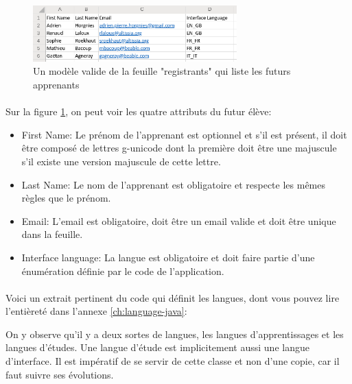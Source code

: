 \begin{figure}[ht]
    \centering
    \includegraphics[width=0.7\textwidth]{images/screenshot/sheet-users.png}
    \caption{Un modèle valide de la feuille "registrants" qui liste les futurs apprenants}
    \label{fig:sheet-learners}
\end{figure}

\paragraph{}
Sur la figure \ref{fig:sheet-learners}, on peut voir les quatre attributs du futur élève:
\begin{itemize}
    \item First Name: Le prénom de l'apprenant est optionnel et s'il est présent, il doit être composé de lettres \gls{g-unicode} dont la première doit être une majuscule s'il existe une version majuscule de cette lettre\fnmark{}.
    \item Last Name: Le nom de l'apprenant est obligatoire et respecte les mêmes règles que le prénom.
    \item Email: L'email est obligatoire, doit être un email valide et doit être unique dans la feuille.
    \item Interface language: La langue est obligatoire et doit faire partie d'une énumération définie par le code de l'application.
\end{itemize}

\paragraph{}
Voici un extrait pertinent du code qui définit les langues, dont vous pouvez lire l'entièreté dans l'annexe \ref{ch:language-java}:



On y observe qu'il y a deux sortes de langues, les langues d'apprentissages et les langues d'études.
Une langue d'étude est implicitement aussi une langue d'interface.
Il est impératif de se servir de cette classe et non d'une copie, car il faut suivre ses évolutions.

